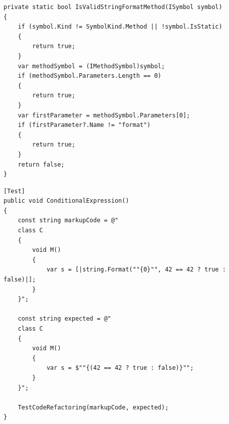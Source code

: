 \begin{lstlisting}[caption={Methode \textit{IsValidStringFormatMethod}},
label=lst:code-IsValidStringFormatMethod]
private static bool IsValidStringFormatMethod(ISymbol symbol)
{
	if (symbol.Kind != SymbolKind.Method || !symbol.IsStatic)
	{
		return true;
	}
	var methodSymbol = (IMethodSymbol)symbol;
	if (methodSymbol.Parameters.Length == 0)
	{
		return true;
	}
	var firstParameter = methodSymbol.Parameters[0];
	if (firstParameter?.Name != "format")
	{
		return true;
	}
	return false;
}
\end{lstlisting}

\begin{lstlisting}[caption={Mehtode \textit{ConditionalExpression}},
label=lst:code-ConditionalExpression]
[Test]
public void ConditionalExpression()
{
	const string markupCode = @"
	class C
	{
		void M()
		{
			var s = [|string.Format(""{0}"", 42 == 42 ? true : false)|];
		}
	}";
	
	const string expected = @"
	class C
	{
		void M()
		{
			var s = $""{(42 == 42 ? true : false)}"";
		}
	}";

	TestCodeRefactoring(markupCode, expected);
}
\end{lstlisting}
